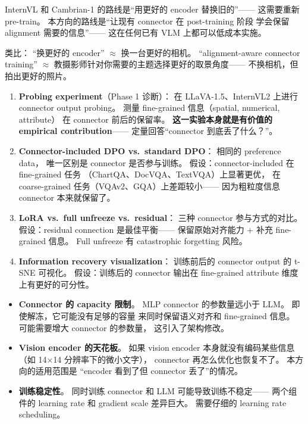 \documentclass[12pt,a4paper]{article}
\begin{document}
InternVL 和 Cambrian-1 的路线是``用更好的 encoder 替换旧的''——
这需要重新 pre-train。
本方向的路线是``让现有 connector 在 post-training 阶段
学会保留 alignment 需要的信息''——
这在任何已有 VLM 上都可以低成本实施。

类比：
``换更好的 encoder'' $\approx$ 换一台更好的相机。
``alignment-aware connector training'' $\approx$
教摄影师针对你需要的主题选择更好的取景角度——
不换相机，但拍出更好的照片。

\begin{expbox}
\begin{enumerate}[leftmargin=1.5em]
  \item \textbf{Probing experiment}（Phase 1 诊断）：
    在 LLaVA-1.5、InternVL2 上进行 connector output probing。
    测量 fine-grained 信息（spatial, numerical, attribute）
    在 connector 前后的保留率。
    \textbf{这一实验本身就是有价值的 empirical contribution}——
    定量回答``connector 到底丢了什么？''。

  \item \textbf{Connector-included DPO vs.\ standard DPO}：
    相同的 preference data，
    唯一区别是 connector 是否参与训练。
    假设：connector-included 在 fine-grained 任务
    （ChartQA、DocVQA、TextVQA）上显著更优，
    在 coarse-grained 任务（VQAv2、GQA）上差距较小——
    因为粗粒度信息 connector 本来就保留了。

  \item \textbf{LoRA vs.\ full unfreeze vs.\ residual}：
    三种 connector 参与方式的对比。
    假设：residual connection 是最佳平衡——
    保留原始对齐能力 + 补充 fine-grained 信息。
    Full unfreeze 有 catastrophic forgetting 风险。

  \item \textbf{Information recovery visualization}：
    训练前后的 connector output 的 t-SNE 可视化。
    假设：训练后的 connector 输出在
    fine-grained attribute 维度上有更好的可分性。
\end{enumerate}
\end{expbox}

\begin{riskbox}
\begin{itemize}[leftmargin=1.5em]
  \item \textbf{Connector 的 capacity 限制}。
    MLP connector 的参数量远小于 LLM。
    即使解冻，它可能没有足够的容量
    来同时保留语义对齐和 fine-grained 信息。
    可能需要增大 connector 的参数量，
    这引入了架构修改。
  \item \textbf{Vision encoder 的天花板}。
    如果 vision encoder 本身就没有编码某些信息
    （如 14$\times$14 分辨率下的微小文字），
    connector 再怎么优化也恢复不了。
    本方向的适用范围是
    ``encoder 看到了但 connector 丢了''的情况。
  \item \textbf{训练稳定性}。
    同时训练 connector 和 LLM 可能导致训练不稳定——
    两个组件的 learning rate 和 gradient scale 差异巨大。
    需要仔细的 learning rate scheduling。
\end{itemize}
\end{riskbox}
\end{document}
